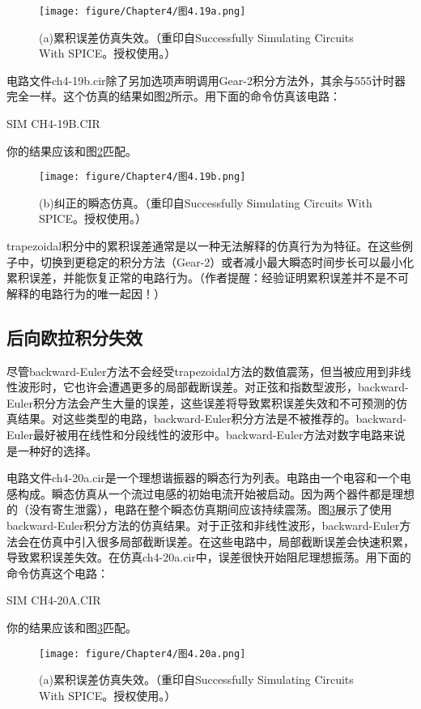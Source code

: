 \begin{figure}[htbp]
\small
    \centering
    \texttt{[image: figure/Chapter4/图4.19a.png]}
    \caption{(a)累积误差仿真失效。（重印自Successfully Simulating Circuits With SPICE。授权使用。）}
    \label{图4.19a}
\end{figure}

电路文件ch4-19b.cir除了另加选项声明调用Gear-2积分方法外，其余与555计时器完全一样。这个仿真的结果如图\ref{图4.19b}所示。用下面的命令仿真该电路：

SIM CH4-19B.CIR

你的结果应该和图\ref{图4.19b}匹配。

\begin{figure}[htbp]
\small
    \centering
    \texttt{[image: figure/Chapter4/图4.19b.png]}
    \caption{(b)纠正的瞬态仿真。（重印自Successfully Simulating Circuits With SPICE。授权使用。）}
    \label{图4.19b}
\end{figure}

trapezoidal积分中的累积误差通常是以一种无法解释的仿真行为为特征。在这些例子中，切换到更稳定的积分方法（Gear-2）或者减小最大瞬态时间步长可以最小化累积误差，并能恢复正常的电路行为。（作者提醒：经验证明累积误差并不是不可解释的电路行为的唯一起因！）

\subsection{后向欧拉积分失效}
尽管backward-Euler方法不会经受trapezoidal方法的数值震荡，但当被应用到非线性波形时，它也许会遭遇更多的局部截断误差。对正弦和指数型波形，backward-Euler积分方法会产生大量的误差，这些误差将导致累积误差失效和不可预测的仿真结果。对这些类型的电路，backward-Euler积分方法是不被推荐的。backward-Euler最好被用在线性和分段线性的波形中。backward-Euler方法对数字电路来说是一种好的选择。

电路文件ch4-20a.cir是一个理想谐振器的瞬态行为列表。电路由一个电容和一个电感构成。瞬态仿真从一个流过电感的初始电流开始被启动。因为两个器件都是理想的（没有寄生泄露），电路在整个瞬态仿真期间应该持续震荡。图\ref{图4.20a}展示了使用backward-Euler积分方法的仿真结果。对于正弦和非线性波形，backward-Euler方法会在仿真中引入很多局部截断误差。在这些电路中，局部截断误差会快速积累，导致累积误差失效。在仿真ch4-20a.cir中，误差很快开始阻尼理想振荡。用下面的命令仿真这个电路：

SIM CH4-20A.CIR

你的结果应该和图\ref{图4.20a}匹配。
\begin{figure}[htbp]
\small
    \centering
    \texttt{[image: figure/Chapter4/图4.20a.png]}
    \caption{(a)累积误差仿真失效。（重印自Successfully Simulating Circuits With SPICE。授权使用。）}
    \label{图4.20a}
\end{figure}

